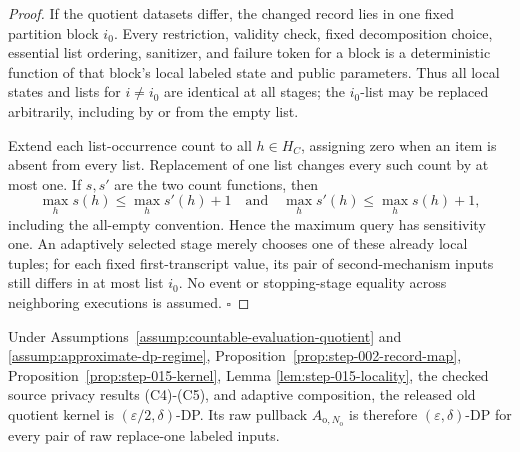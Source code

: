 \begin{proof}
If the quotient datasets differ, the changed record lies in one fixed
partition block \(i_0\). Every restriction, validity check, fixed
decomposition choice, essential list ordering, sanitizer, and failure token
for a block is a deterministic function of that block's local labeled
state and public parameters. Thus all local states and lists for
\(i\ne i_0\) are identical at all stages; the \(i_0\)-list may be
replaced arbitrarily, including by or from the empty list.

Extend each list-occurrence count to all \(h\in H_C\), assigning zero when
an item is absent from every list. Replacement of one list changes every
such count by at most one. If \(s,s'\) are the two count functions, then
\[
\max_hs(h)\le\max_hs'(h)+1
\quad\text{and}\quad
\max_hs'(h)\le\max_hs(h)+1,
\]
including the all-empty convention. Hence the maximum query has
sensitivity one. An adaptively selected stage merely chooses one of these
already local tuples; for each fixed first-transcript value, its pair of
second-mechanism inputs still differs in at most list \(i_0\). No event or
stopping-stage equality across neighboring executions is assumed.
\(\square\)


\end{proof}

\begin{proposition}\label{prop:step-015-dp}
Under Assumptions~\ref{assump:countable-evaluation-quotient} and
\ref{assump:approximate-dp-regime}, Proposition~\ref{prop:step-002-record-map},
Proposition~\ref{prop:step-015-kernel}, Lemma
\ref{lem:step-015-locality}, the checked source privacy results (C4)-(C5),
and adaptive composition, the released old quotient kernel is
\((\varepsilon/2,\delta)\)-DP. Its raw pullback
\(A_{\mathrm o,N_{\mathrm o}}\) is therefore
\((\varepsilon,\delta)\)-DP for every pair of raw replace-one labeled
inputs.


\end{proposition}

